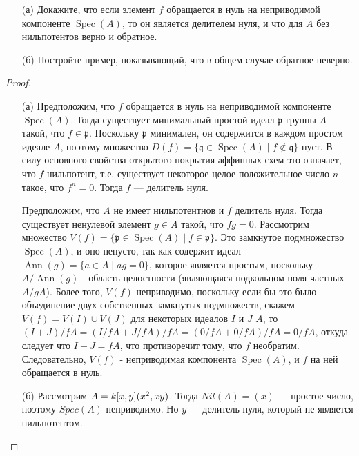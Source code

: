 \begin{prob}
\begin{itemize}
\item[]
\item[(а)] Докажите, что если элемент $f$ обращается в нуль на неприводимой компоненте $\operatorname{Spec}(A)$, то он является делителем нуля, и что для $A$ без нильпотентов верно и обратное.
\item[(б)] Постройте пример, показывающий, что в общем случае обратное неверно.
\end{itemize}
\end{prob}
\begin{proof}
\begin{itemize}
\item[]
\item[(а)] Предположим, что $f$ обращается в нуль на неприводимой компоненте $\operatorname{Spec}(A)$. Тогда существует минимальный простой идеал $\mathfrak{p}$ группы $A$ такой, что $f \in \mathfrak{p}$. Поскольку $\mathfrak{p}$ минимален, он содержится в каждом простом идеале $A$, поэтому множество $D(f) = \{\mathfrak{q} \in \operatorname{Spec}(A) \mid f \notin \mathfrak{q}\}$ пуст. В силу основного свойства открытого покрытия аффинных схем это означает, что $f$ нильпотент, т.е. существует некоторое целое положительное число $n$ такое, что $f^n = 0$. Тогда $f$ — делитель нуля.

Предположим, что $A$ не имеет нильпотентнов и $f$ делитель нуля. Тогда существует ненулевой элемент $g \in A$ такой, что $fg = 0$. Рассмотрим множество $V(f) = \{\mathfrak{p} \in \operatorname{Spec}(A) \mid f \in \mathfrak{p}\}$. Это замкнутое подмножество $\operatorname{Spec}(A)$, и оно непусто, так как содержит идеал $\operatorname{Ann}(g) = \{a \in A \mid ag = 0\} $, которое является простым, поскольку $A/\operatorname{Ann}(g)$ - область целостности (являющаяся подкольцом поля частных $A/gA$). Более того, $V(f)$ неприводимо, поскольку если бы это было объединение двух собственных замкнутых подмножеств, скажем $V(f) = V(I) \cup V(J)$ для некоторых идеалов $I$ и $J $ $A$, то $(I + J)/fA = (I/fA + J/fA)/fA = (0/fA + 0/fA)/fA = 0/fA$, откуда следует что $I + J = fA$, что противоречит тому, что $f$ необратим. Следовательно, $V(f)$ - неприводимая компонента $\operatorname{Spec}(A)$, и $f$ на ней обращается в нуль.

\item[(б)] Рассмотрим $A=k[x,y]\/(x^2,xy)$. Тогда $Nil(A)=(x)$ — простое число, поэтому $Spec(A)$ неприводимо. Но $y$ — делитель нуля, который не является нильпотентом.
\end{itemize}
\end{proof}
\begin{comment}
https://math.stackexchange.com/questions/2141558/irreducible-spectrum-implies-zero-divisors-are-nilpotent
https://ocw.mit.edu/courses/18-726-algebraic-geometry-spring-2009/3723a99e97b581828fd782b9ffd83921_MIT18_726s09_lec11_more_schemes.pdf
\end{comment}
\vskip 0.6in





